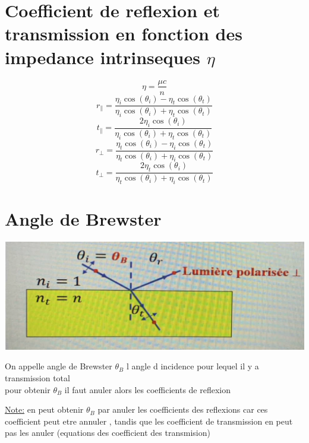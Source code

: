 \documentclass[12pt]{book}
\begin{document}
        \section{Coefficient de reflexion et transmission en fonction des impedance intrinseques $\eta$}
            \[\eta = \frac{\mu c}{n}\]
            \[ r_\parallel = \frac{\eta_i \cos(\theta_i)-\eta_t\cos(\theta_t)}{\eta_i \cos(\theta_i)+\eta_t\cos(\theta_t)}\]
            \[ t_\parallel = \frac{2\eta_i \cos(\theta_i)}{\eta_i \cos(\theta_i)+\eta_t\cos(\theta_t)}\]
            \[ r_\perp = \frac{\eta_t \cos(\theta_i)-\eta_i\cos(\theta_t)}{\eta_t \cos(\theta_i)+\eta_i\cos(\theta_t)}\]
            \[ t_\perp = \frac{2\eta_t \cos(\theta_i)}{\eta_t \cos(\theta_i)+\eta_i\cos(\theta_t)}\]
        \section{Angle de Brewster }
            \begin{center}
                \includegraphics[width = 0.6\linewidth]{pic/brewster.png}
            \end{center}
            On appelle angle de Brewster $\theta_B$ l angle d incidence pour lequel il y a transmission total \\
            pour obtenir $\theta_B$ il faut anuler alors les coefficients de reflexion \\
            \begin{center}
            \end{center}
            \begin{center}
                \underline{Note:} en peut obtenir $\theta_B$ par anuler les coefficients des reflexions car ces coefficient peut etre annuler , tandis que les coefficient de transmission en peut pas les anuler (equations des coefficient des transmision)
            \end{center}
\end{document}
